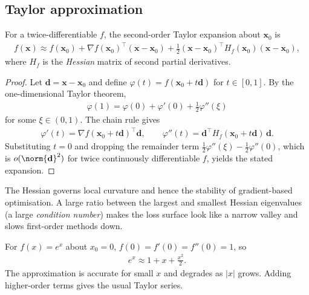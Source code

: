 \documentclass[a4paper, 12pt]{book}
\begin{document}
\subsection{Taylor approximation}

\begin{proposition}
    For a twice-differentiable $f$, the second-order Taylor expansion about
$\mathbf{x}_0$ is
\begin{align}
    f(\mathbf{x}) \approx f(\mathbf{x}_0)
    + \nabla f(\mathbf{x}_0)^\top (\mathbf{x} - \mathbf{x}_0)
    + \frac{1}{2} (\mathbf{x} - \mathbf{x}_0)^\top H_f(\mathbf{x}_0) (\mathbf{x} - \mathbf{x}_0),
\end{align}
where $H_f$ is the \emph{Hessian} matrix of second partial derivatives.
\end{proposition}
\begin{proof}
    Let $\mathbf{d}=\mathbf{x}-\mathbf{x}_0$ and define
    $\varphi(t)=f(\mathbf{x}_0+t\mathbf{d})$ for $t\in[0,1]$. By the
    one-dimensional Taylor theorem,
    \begin{align}
        \varphi(1) = \varphi(0) + \varphi'(0) + \frac12\varphi''(\xi)
    \end{align}
    for some $\xi\in(0,1)$. The chain rule gives
    \begin{align}
        \varphi'(t) = \nabla f(\mathbf{x}_0+t\mathbf{d})^\top\mathbf{d},
        \qquad
        \varphi''(t) = \mathbf{d}^\top H_f(\mathbf{x}_0+t\mathbf{d})\,\mathbf{d}.
    \end{align}
    Substituting $t=0$ and dropping the remainder term
    $\frac12\varphi''(\xi)-\frac12\varphi''(0)$, which is $o(\norm{\mathbf{d}}^2)$
    for twice continuously differentiable $f$, yields the stated expansion.
\end{proof}
The Hessian governs local curvature and hence the stability of gradient-based optimisation. A large ratio between the largest and smallest Hessian eigenvalues (a large \emph{condition number}) makes the loss surface look like a narrow valley and slows first-order methods down.

\begin{example}
    For $f(x)=e^x$ about $x_0=0$, $f(0)=f'(0)=f''(0)=1$, so
    \begin{align}
        e^x \approx 1+x+\frac{x^2}{2}.
    \end{align}
    The approximation is accurate for small $x$ and degrades as $|x|$ grows. Adding
    higher-order terms gives the usual Taylor series.
\end{example}
\end{document}
